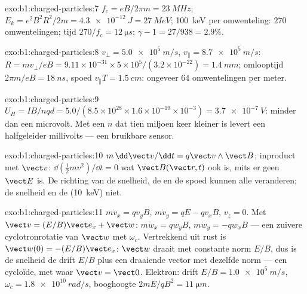 \begin{solution}{exo:b1:charged-particles:7}
$f_c = eB/2\pi m = \qty{23}{MHz}$; $E_k = e^2B^2R^2/2m = \qty{4.3e-12}{J} =
\qty{27}{MeV}$; \qty{100}{keV} per omwenteling: $270$ omwentelingen; tijd $270/f_c =
\qty{12}{\micro s}$; $\gamma - 1 = 27/938 = 2.9\%$.
\end{solution}

\begin{solution}{exo:b1:charged-particles:8}
$v_\perp = \qty{5.0e5}{m/s}$, $v_\parallel = \qty{8.7e5}{m/s}$: $R = mv_\perp/eB
= 9.11\times10^{-31} \times 5\times10^5/(3.2\times10^{-22}) = \qty{1.4}{mm}$;
omlooptijd $2\pi m/eB = \qty{18}{ns}$, spoed $v_\parallel T = \qty{1.5}{cm}$:
ongeveer $64$ omwentelingen per meter.
\end{solution}

\begin{solution}{exo:b1:charged-particles:9}
$U_H = IB/nqd = 5.0/(8.5\times10^{28} \times 1.6\times10^{-19} \times 10^{-3})
= \qty{3.7e-7}{V}$: minder dan een microvolt. Met een $n$ dat tien miljoen keer
kleiner is levert een halfgeleider millivolts --- een bruikbare sensor.
\end{solution}

\begin{solution}{exo:b1:charged-particles:10}
$m\,\dd\vect v/\dd t = q\vect v\wedge\vect B$; inproduct met $\vect v$: $\dd(\tfrac12 mv^2)/
\dd t = 0$ wat $\vect B(\vect r, t)$ ook is, mits er geen $\vect E$ is. De
richting van de snelheid, de  en de spoed kunnen alle
veranderen; de snelheid en de  (\qty{10}{keV}) niet.
\end{solution}

\begin{solution}{exo:b1:charged-particles:11}
$m\dot v_x = qv_yB$, $m\dot v_y = qE - qv_xB$, $v_z = 0$. Met $\vect v =
(E/B)\vect e_x + \vect w$: $m\dot w_x = qw_yB$, $m\dot w_y = -qw_xB$ --- een
zuivere cyclotronrotatie van $\vect w$ met $\omega_c$. Vertrekkend uit rust is
$\vect w(0) = -(E/B)\vect e_x$: $\vect w$ draait met constante norm $E/B$, dus is de
snelheid de drift $E/B$ plus een draaiende vector met dezelfde norm ---
een cycloïde, met  waar $\vect v = \vect 0$. Elektron: drift $E/B =
\qty{1.0e5}{m/s}$, $\omega_c = \qty{1.8e10}{rad/s}$, booghoogte $2mE/qB^2 =
\qty{11}{\micro m}$.
\end{solution}

